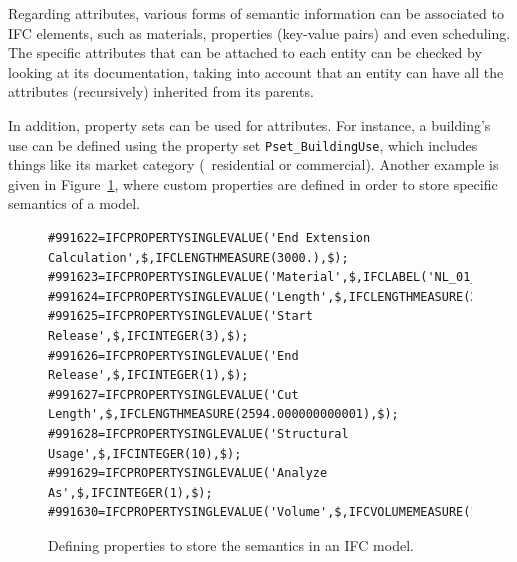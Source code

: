 Regarding attributes, various forms of semantic information can be associated to IFC elements, such as materials, properties (key-value pairs) and even scheduling.
The specific attributes that can be attached to each entity can be checked by looking at its documentation, taking into account that an entity can have all the attributes (recursively) inherited from its parents.

In addition, property sets can be used for attributes.
For instance, a building's use can be defined using the property set \texttt{Pset\_BuildingUse}, which includes things like its market category (\eg\ residential or commercial).
Another example is given in Figure~\ref{fig:pset}, where custom properties are defined in order to store specific semantics of a model.

\begin{figure}[htbp]
\begin{lstlisting}[frame=single]
#991622=IFCPROPERTYSINGLEVALUE('End Extension Calculation',$,IFCLENGTHMEASURE(3000.),$);
#991623=IFCPROPERTYSINGLEVALUE('Material',$,IFCLABEL('NL_01_hout_plaat'),$);
#991624=IFCPROPERTYSINGLEVALUE('Length',$,IFCLENGTHMEASURE(2594.),$);
#991625=IFCPROPERTYSINGLEVALUE('Start Release',$,IFCINTEGER(3),$);
#991626=IFCPROPERTYSINGLEVALUE('End Release',$,IFCINTEGER(1),$);
#991627=IFCPROPERTYSINGLEVALUE('Cut Length',$,IFCLENGTHMEASURE(2594.000000000001),$);
#991628=IFCPROPERTYSINGLEVALUE('Structural Usage',$,IFCINTEGER(10),$);
#991629=IFCPROPERTYSINGLEVALUE('Analyze As',$,IFCINTEGER(1),$);
#991630=IFCPROPERTYSINGLEVALUE('Volume',$,IFCVOLUMEMEASURE(13602936.00000029),$);
\end{lstlisting}
\caption{Defining properties to store the semantics in an IFC model.}%
\label{fig:pset}
\end{figure}




